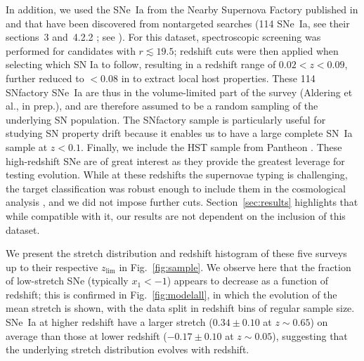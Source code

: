 \documentclass[]{aa}
\begin{document}
In addition, we used the SNe~Ia from the Nearby Supernova Factory
\citep[SNfactory,][]{aldering2002} published in \cite{rigault2020} and that have
been discovered from nontargeted searches (114 SNe~Ia, see their sections~3
and~4.2.2 ; see \citealt{aldering2020}). For this dataset, spectroscopic
screening was performed for candidates with $r \lesssim 19.5$; redshift cuts
were then applied when selecting which SN Ia to follow, resulting in a redshift
range of $0.02 < z < 0.09$, further reduced to $<0.08$ in \cite{rigault2020} to
extract local host properties. These 114 SNfactory SNe~Ia are thus in the
volume-limited part of the survey (Aldering et al., in prep.), and are therefore
assumed to be a random sampling of the underlying SN population. The SNfactory
sample is particularly useful for studying SN property drift because it enables
us to have a large complete SN~Ia sample at $z<0.1$. Finally, we include the HST
sample from Pantheon \citep{strolger04}. These high-redshift SNe are of great
interest as they provide the greatest leverage for testing evolution. While at
these redshifts the supernovae typing is challenging, the target classification
was robust enough to include them in the cosmological analysis
\citep{scolnic2018a}, and we did not impose further cuts.
Section~\ref{sec:results} highlights that while compatible with it, our results
are not dependent on the inclusion of this dataset.

We present the stretch distribution and redshift histogram of these five surveys
up to their respective $z_{\lim}$ in Fig.~\ref{fig:sample}. We observe here that
the fraction of low-stretch SNe (typically $x_1 < -1$) appears to decrease as a
function of redshift; this is confirmed in Fig.~\ref{fig:modelall}, in which the
evolution of the mean stretch is shown, with the data split in redshift bins of
regular sample size. SNe~Ia at higher redshift have a larger stretch ($0.34 \pm
0.10$ at $z\sim0.65$) on average than those at lower redshift ($-0.17\pm 0.10$
at $z\sim0.05$), suggesting that the underlying stretch distribution evolves
with redshift.
\end{document}
